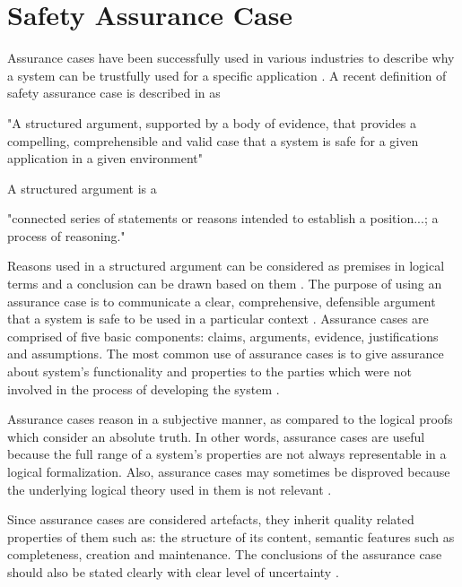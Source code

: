 \section{Safety Assurance Case}
Assurance cases have been successfully used in various industries to describe why a system can be trustfully used for a specific application \cite{Ashmore2021}.
A recent definition of safety assurance case is described in \cite{Bloomfield2010} as


\begin{displayquote}[][]
"A structured argument, supported by a body of evidence, that provides a compelling, comprehensible and valid case that a system is safe for a given application in a given environment"
\end{displayquote}
A structured argument is a \cite{Omg2010}
\begin{displayquote}[][]
"connected series of statements or reasons intended to establish a position...; a process of reasoning."
\end{displayquote}
Reasons used in a structured argument can be considered as premises in logical terms and a conclusion can be drawn based on them \cite{Omg2010}.  
The purpose of using an assurance case is to communicate a clear, comprehensive, defensible argument that a system is safe to be used in a particular context \cite{gsn2004Kelly}. Assurance cases are comprised of five basic components: claims, arguments, evidence, justifications and assumptions. The most common use of assurance cases is to give assurance about system's functionality and properties to the parties which were not involved in the process of developing the system \cite{iso15026-1-2019}.

Assurance cases reason in a subjective manner, as compared to the logical proofs which consider an absolute truth. In other words, assurance cases are useful because the full range of a system's properties are not always representable in a logical formalization. Also, assurance cases may sometimes be disproved because the underlying logical theory used in them is not relevant \cite{iso15026-1-2019}.

Since assurance cases are considered artefacts, they inherit quality related properties of them such as: the structure of its content, semantic features such as completeness, creation and maintenance. The conclusions of the assurance case should also be stated clearly with clear level of uncertainty \cite{iso15026-1-2019}. 

